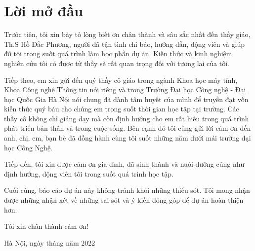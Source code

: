 \chapter*{Lời mở đầu}

Trước tiên, tôi xin bày tỏ lòng biết ơn chân thành và sâu sắc nhất đến thầy giáo, Th.S Hồ Đắc Phương, người đã tận tình chỉ bảo, hướng dẫn, động viên và giúp đỡ tôi trong suốt quá trình làm học phần dự án. Kiến thức và kinh nghiệm nghiên cứu tôi có được từ thầy sẽ rất quan trọng đối với tương lai của tôi.

Tiếp theo, em xin gửi đến quý thầy cô giáo trong ngành Khoa học máy tính, Khoa Công nghệ Thông tin nói riêng và trong Trường Đại học Công nghệ - Đại học Quốc Gia Hà Nội nói chung đã dành tâm huyết của mình để truyền đạt vốn kiến thức quý báu cho chúng em trong suốt thời gian học tập tại trường. Các thầy cô không chỉ giảng dạy mà còn định hướng cho em rất hiều trong quá trình phát triển bản thân và trong cuộc sống. Bên cạnh đó tôi cũng gửi lời cảm ơn đến anh, chị, em, bạn bè đã đồng hành cùng tôi suốt những năm dưới mái trường đại học Công Nghệ.

Tiếp đến, tôi xin được cảm ơn gia đình, đã sinh thành và nuôi dưỡng cũng như định hướng, động viên tôi trong suốt quá trình học tập.

Cuối cùng, báo cáo dự án này không tránh khỏi những thiếu sót. Tôi mong nhận được những nhận xét về những sai sót và ý kiến đóng góp để dự án hoàn thiện hơn.

Tôi xin chân thành cảm ơn!

\begin{flushright}
Hà Nội, ngày \hspace{1cm} tháng \hspace{0.5cm} năm 2022
\end{flushright}
